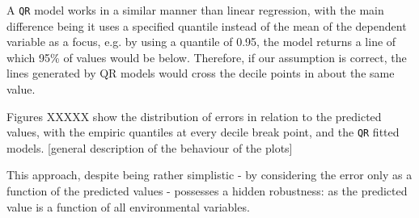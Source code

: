 \documentclass[12pt]{article}
\begin{document}
\par A \texttt{QR} model works in a similar manner than linear regression, with the main difference being it uses a specified quantile instead of the mean of the dependent variable as a focus, e.g. by using a quantile of 0.95, the model returns a line of which 95\% of values would be below. Therefore, if our assumption is correct, the lines generated by QR models would cross the decile points in about the same value.

\par Figures XXXXX show the distribution of errors in relation to the predicted values, with the empiric quantiles at every decile break point, and the \texttt{QR} fitted models. [general description of the behaviour of the plots]

\par This approach, despite being rather simplistic - by considering the error only as a function of the predicted values - possesses a hidden robustness: as the predicted value is a function of all environmental variables.

\par [continue text here with rationality and presentation of the final estimation]
\end{document}
